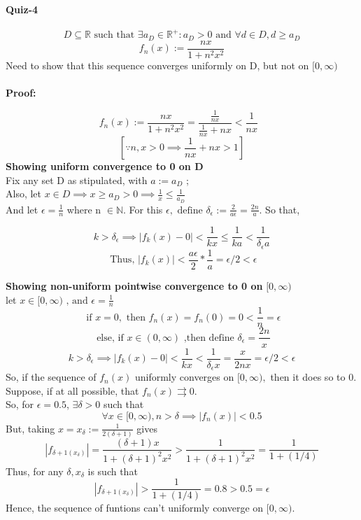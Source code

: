 \documentclass[20pt]{extarticle} %
\begin{document}
\paragraph{Quiz-4}

\[D \subseteq \mathbb{R} \text{ such that } \exists a_D \in \mathbb{R^+}: a_D >0 \text{ and }  \forall d \in D, d \geq a_D    \]
\[  f_n(x):= \frac{nx}{1+n^2x^2}   \]
Need to show that this sequence converges uniformly on D, but not on $[0,\infty)$\\\\
\textbf{Proof:}

	\[  f_n(x):= \frac{nx}{1+n^2x^2}= \frac {\frac{1}{nx}}{ \frac{1}{nx}+nx}< \frac{1}{nx} \text{   } \]
	\[ [    \because n,x>0 \implies \frac{1}{nx}+nx>1 ] \]
\textbf{Showing uniform convergence to 0 on D}\\
	Fix any set D as stipulated, with $a:=a_D$ ;
	\\Also, let $x \in D \implies x \geq a_D >0 \implies \frac{1}{x} \leq \frac{1}{a_D}  $ \\
	And let $\epsilon = \frac{1}{n}$ where n $\in \mathbb{N}$.
	For this $\epsilon, \text{ define }  \delta_\epsilon:= \frac{2}{a\epsilon} = \frac{2n}{a} $. So that,

	\[ k> \delta_\epsilon \implies |f_k(x)-0|< \frac{1}{kx} \leq \frac{1}{ka}  < \frac{1}{\delta_\epsilon a}\]
	\[ \text{ Thus, } |f_k(x)|< \frac{a\epsilon}{2} * \frac{1}{a}=\epsilon/2<\epsilon \]
\newpage

\textbf{Showing non-uniform pointwise convergence to 0 on }$[0,\infty)$\\
let $x\in[ 0,\infty) \text{ , and } \epsilon= \frac{1}{n}$ \\
	\[ \text{ if } x=0, \text{ then } f_n(x)=f_n(0)=0< \frac{1}{n}=\epsilon  \]
\[\text{ else, if }x \in (0,\infty) \text{ ,then define }\delta_\epsilon= \frac{2n}{x} \]
\[ k> \delta_\epsilon \implies |f_k(x)-0|< \frac{1}{kx}  < \frac{1}{\delta_\epsilon x}= \frac{x}{2nx}=\epsilon/2< \epsilon \]
So, if the sequence of $f_n(x)$ uniformly converges on $[0,\infty),$ then it does so to 0. Suppose, if at all possible, that $f_n(x) \rightrightarrows 0$.\\
So, for $\epsilon=0.5$, $\exists \delta>0$ such that
\[ \forall x \in[0,\infty), n>\delta \implies |f_n(x)|< 0.5\]
But, taking $x = x_\delta := \frac{1}{2(\delta+1)} $ gives
\[|f_{\delta+1(x_\delta)}|= \frac{(\delta+1)x}{1+(\delta +1)^2x^2}> \frac{1}{1+(\delta +1)^2x^2}= \frac{1}{1+(1/4)}\]
Thus, for any $\delta, x_\delta$ is such that
\[ |f_{\delta+1(x_\delta)}| > \frac{1}{1+(1/4)}= 0.8>0.5=\epsilon \]
Hence, the sequence of funtions can't uniformly converge on $[0,\infty)$.
\end{document}
